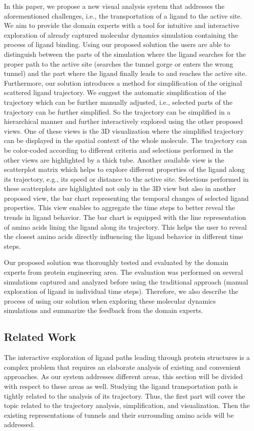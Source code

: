 \documentclass[twocolumn]{bmcart}%
\begin{document}
In this paper, we propose a new visual analysis system that addresses the aforementioned challenges, i.e., the transportation of a ligand to the active site. 
We aim to provide the domain experts with a tool for intuitive and interactive exploration of already captured molecular dynamics simulation containing the process of ligand binding. 
Using our proposed solution the users are able to distinguish between the parts of the simulation where the ligand searches for the proper path to the active site (searches the tunnel gorge or enters the wrong tunnel) and the part where the ligand finally leads to and reaches the active site.
Furthermore, our solution introduces a method for simplification of the original scattered ligand trajectory.
We suggest the automatic simplification of the trajectory which can be further manually adjusted, i.e., selected parts of the trajectory can be further simplified.
So the trajectory can be simplified in a hierarchical manner and further interactively explored using the other proposed views.
One of these views is the 3D visualization where the simplified trajectory can be displayed in the spatial context of the whole molecule.
The trajectory can be color-coded according to different criteria and selections performed in the other views are highlighted by a thick tube.
Another available view is the scatterplot matrix which helps to explore different properties of the ligand along its trajectory, e.g., its speed or distance to the active site. 
Selections performed in these scatterplots are highlighted not only in the 3D view but also in another proposed view, the bar chart representing the temporal changes of selected ligand properties. 
This view enables to aggregate the time steps to better reveal the trends in ligand behavior.
The bar chart is equipped with the line representation of amino acids lining the ligand along its trajectory. 
This helps the user to reveal the closest amino acids directly influencing the ligand behavior in different time steps.

Our proposed solution was thoroughly tested and evaluated by the domain experts from protein engineering area.
The evaluation was performed on several simulations captured and analyzed before using the traditional approach (manual exploration of ligand in individual time steps). 
Therefore, we also describe the process of using our solution when exploring these molecular dynamics simulations and summarize the feedback from the domain experts.

\subsection*{Related Work}
The interactive exploration of ligand paths leading through protein structures is a complex problem that requires an elaborate analysis of existing and convenient approaches.
As our system addresses different areas, this section will be divided with respect to these areas as well. 
Studying the ligand transportation path is tightly related to the analysis of its trajectory.
Thus, the first part will cover the topic related to the trajectory analysis, simplification, and visualization.
Then the existing representations of tunnels and their surrounding amino acids will be addressed.
\end{document}
